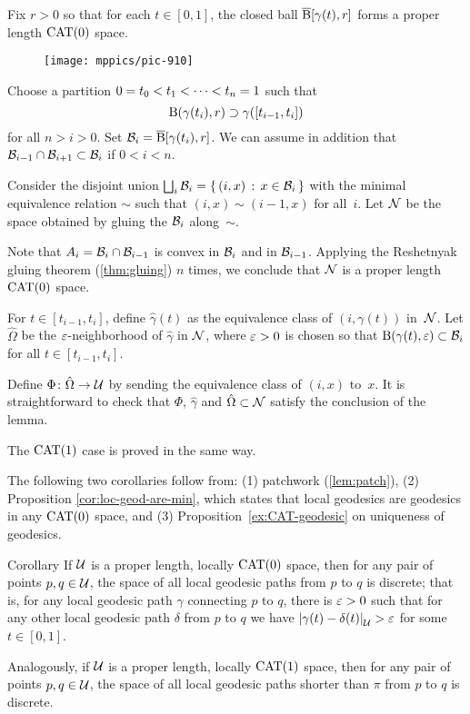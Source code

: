 Fix $r>0$ so that for each $t\in[0,1]$,
the closed ball
$\overline{\mathrm{B}}{}[\gamma(t),r]$ forms a proper length $\mathrm{CAT}(0)$ space.

\begin{figure}[h!]
\vskip-0mm
\centering
\texttt{[image: mppics/pic-910]}
\end{figure}

Choose a partition $0\z=t_0<t_1<\dots<t_n\z=1$ such that 
\[\mathrm{B}{}(\gamma(t_i),r)\supset \gamma([t_{i-1},t_i])\] for all $n>i>0$.
Set $\mathcal{B}_i=\overline{\mathrm{B}}{}[\gamma(t_i),r]$.
We can assume in addition that $\mathcal{B}_{i-1}\cap \mathcal{B}_{i+1}\subset \mathcal{B}_{i}$ if $0<i<n$.

Consider the disjoint union $\bigsqcup_i\mathcal{B}_i=\left\{\,{(i,x)}\,:\,{x\in\mathcal{B}_i}\,\right\}$ with the minimal equivalence relation $\sim$ such that $(i,x)\sim(i-1,x)$ for all~$i$.
Let  $\mathcal{N}$ be the space obtained by gluing the $\mathcal{B}_i$ along~$\sim$.

Note that $A_i=\mathcal{B}_i\cap\mathcal{B}_{i-1}$ is convex in $\mathcal{B}_i$ and in $\mathcal{B}_{i-1}$.
Applying the Reshetnyak gluing theorem (\ref{thm:gluing}) $n$ times, 
we conclude that $\mathcal{N}$ is a proper length $\mathrm{CAT}(0)$ space.

For $t\in[t_{i-1},t_i]$, define $\hat\gamma(t)$ as the equivalence class of $(i,\gamma(t))$ in~$\mathcal{N}$.
Let $\hat\Omega$ be the $\varepsilon$-neighborhood of $\hat\gamma$ in $\mathcal{N}$, where $\varepsilon>0$ is chosen so that $\mathrm{B}{}(\gamma(t),\varepsilon)\subset\mathcal{B}_i$ for all $t\in[t_{i-1},t_i]$.

Define $\Phi\colon\hat\Omega\to\mathcal{U}$
by sending the equivalence class of $(i,x)$ to~$x$.
It is straightforward to check that $\Phi$, 
$\hat\gamma$ and $\hat\Omega\subset\mathcal{N}$ satisfy the conclusion of  the lemma.

The $\mathrm{CAT}(1)$ case is proved in the same way.
\qeds

The following two corollaries follow from:
(1) patchwork (\ref{lem:patch}),
(2) Proposition \ref{cor:loc-geod-are-min}, which states that local geodesics are geodesics in any $\mathrm{CAT}(0)$ space, 
and (3) Proposition~\ref{ex:CAT-geodesic} on uniqueness of geodesics.

\begin{thm}{Corollary}\label{cor:discrete-paths}
If $\mathcal{U}$ is a proper length, locally $\mathrm{CAT}(0)$ space, then for any pair of points $p,q\in\mathcal{U}$, the space of all local geodesic paths from $p$ to $q$ is discrete;
that is, for any local geodesic path $\gamma$ connecting $p$ to $q$, there is $\varepsilon>0$ such that for any other local geodesic path $\delta$ from $p$ to $q$ we have
$\dist{\gamma(t)}{\delta(t)}{\spc{U}}>\eps$ for some $t\in[0,1]$.

Analogously, if $\mathcal{U}$ is a proper length, locally $\mathrm{CAT}(1)$ space, then for any pair of points $p,q\in\mathcal{U}$,  the space of all local geodesic paths shorter than $\pi$ from $p$ to $q$ is discrete.
\end{thm}

